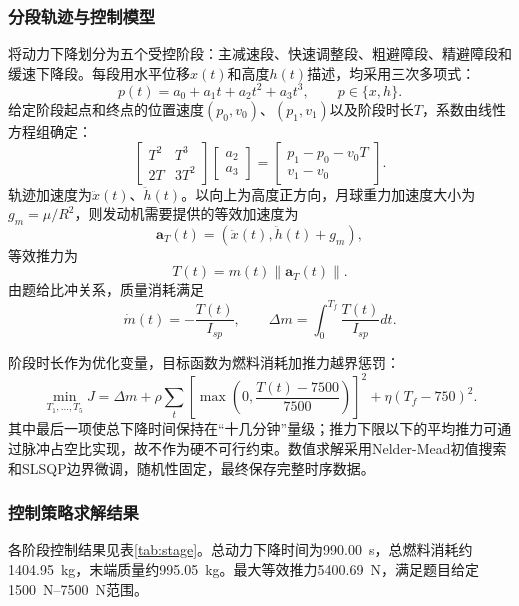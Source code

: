 \documentclass[UTF8,a4paper,12pt]{ctexart}
\begin{document}
\subsubsection{分段轨迹与控制模型}
将动力下降划分为五个受控阶段：主减速段、快速调整段、粗避障段、精避障段和缓速下降段。每段用水平位移$x(t)$和高度$h(t)$描述，均采用三次多项式：
\begin{equation}
 p(t)=a_0+a_1t+a_2t^2+a_3t^3,\qquad p\in\{x,h\}.
\end{equation}
给定阶段起点和终点的位置速度$(p_0,v_0)$、$(p_1,v_1)$以及阶段时长$T$，系数由线性方程组确定：
\begin{equation}
\begin{bmatrix}T^2&T^3\\2T&3T^2\end{bmatrix}
\begin{bmatrix}a_2\\a_3\end{bmatrix}
=\begin{bmatrix}p_1-p_0-v_0T\\v_1-v_0\end{bmatrix}.
\end{equation}
轨迹加速度为$\ddot x(t)$、$\ddot h(t)$。以向上为高度正方向，月球重力加速度大小为$g_m=\mu/R^2$，则发动机需要提供的等效加速度为
\begin{equation}
 \bm a_T(t)=(\ddot x(t),\ddot h(t)+g_m),
\end{equation}
等效推力为
\begin{equation}
 T(t)=m(t)\|\bm a_T(t)\|.
\end{equation}
由题给比冲关系，质量消耗满足
\begin{equation}
 \dot m(t)=-\frac{T(t)}{I_{sp}},\qquad \Delta m=\int_0^{T_f}\frac{T(t)}{I_{sp}}dt.
\end{equation}

阶段时长作为优化变量，目标函数为燃料消耗加推力越界惩罚：
\begin{equation}
 \min_{T_1,\ldots,T_5}J=\Delta m+\rho\sum_t\left[\max\left(0,\frac{T(t)-7500}{7500}\right)\right]^2+\eta(T_f-750)^2.
\end{equation}
其中最后一项使总下降时间保持在``十几分钟''量级；推力下限以下的平均推力可通过脉冲占空比实现，故不作为硬不可行约束。数值求解采用Nelder-Mead初值搜索和SLSQP边界微调，随机性固定，最终保存完整时序数据。

\subsubsection{控制策略求解结果}
各阶段控制结果见表\ref{tab:stage}。总动力下降时间为\SI{990.00}{s}，总燃料消耗约\SI{1404.95}{kg}，末端质量约\SI{995.05}{kg}。最大等效推力\SI{5400.69}{N}，满足题目给定\SI{1500}{N}--\SI{7500}{N}范围。
\end{document}
